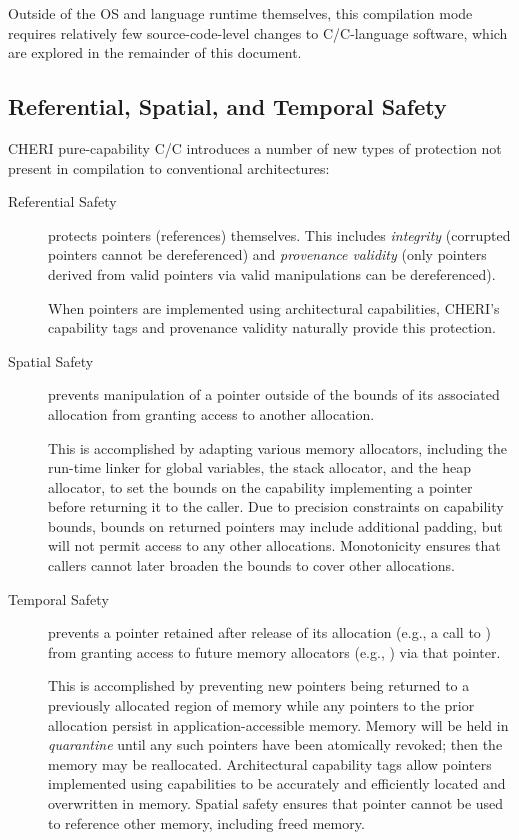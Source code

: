 \documentclass[12pt,twoside,openright,usletter]{article}
\newcommand{\ccode}[1]{{\small\ttfamily{#1}}}
\newcommand{\cfunc}[1]{{\ccode{#1()}}}
\newcommand{\note}[2]{{\color{blue}[ Note: #1 - #2]}}
\renewcommand{\note}[2]{\relax\ifhmode\unskip\fi}
\newcommand{\psnote}[1]{\note{#1}{Peter S.}}
\newcommand*{\cpp}[1][]{C\textsmaller[2]{\nolinebreak[4]\hspace{-.05em}\raisebox{.45ex}{\textbf{++}}}}
\newcommand*{\purecapCOrCpp}[1]{CHERI pure-capability C/\cpp{}}
\begin{document}
Outside of the OS and language runtime themselves, this compilation mode
requires relatively few source-code-level changes to C/\cpp{}-language software,
which are explored in the remainder of this document.

\subsection{Referential, Spatial, and Temporal Safety}

\purecapCOrCpp{} introduces a number of new types of protection not
present in compilation to conventional architectures:

\begin{description}
\item[Referential Safety] protects pointers (references) themselves.
  This includes \textit{integrity} (corrupted pointers cannot be dereferenced)
  and \textit{provenance validity} (only pointers derived from valid pointers
  via valid manipulations can be dereferenced).

  When pointers are implemented using architectural capabilities, CHERI's
  capability tags and provenance validity naturally provide this protection.

\item[Spatial Safety] prevents manipulation of a pointer outside of the bounds
  of its associated allocation from granting access to another allocation.

  \psnote{minor wording change for clarity}
  This is accomplished by adapting various memory allocators, including the run-time
  linker for global variables, the stack allocator, and the heap allocator,
  to set the bounds on the capability implementing a pointer before returning
  it to the caller.
  Due to precision constraints on capability bounds, bounds on returned
  pointers may include additional padding, but will not permit access to any
  other allocations.
  Monotonicity ensures that callers cannot later broaden the bounds to cover
  other allocations.

\psnote{this reads as if temporal safety is always on, for heap and stack and everything, and the post-caveat isn't really enough to counteract that.  I'd suggest putting the first part of the post-caveat text here}
  
\item[Temporal Safety] prevents a pointer retained after release of its allocation
  (e.g., a call to \cfunc{free}) from granting access to future memory allocators
  (e.g., \cfunc{malloc}) via that pointer.

  This is accomplished by preventing new pointers being returned to a
  previously allocated region of memory while any pointers to the prior
  allocation persist in application-accessible memory.
  Memory will be held in \textit{quarantine} until any such pointers have been
  atomically revoked; then the memory may be reallocated.
  Architectural capability tags allow pointers implemented using capabilities
  to be accurately and efficiently located and overwritten in memory.
  Spatial safety ensures that pointer cannot be used to reference other
  memory, including freed memory.
\end{description}
\end{document}
